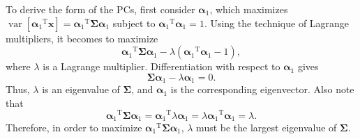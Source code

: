 To derive the form of the PCs, first consider $\boldsymbol{\alpha}_1$, which maximizes $\operatorname{var}\left[{\boldsymbol{\alpha}_1}^{\operatorname{T}}\mathbf{x}\right]={\boldsymbol{\alpha}_1}^{\operatorname{T}}\boldsymbol{\Sigma}\boldsymbol{\alpha}_1$ subject to ${\boldsymbol{\alpha}_1}^{\operatorname{T}}\boldsymbol{\alpha}_1=1$. Using the technique of Lagrange multipliers, it becomes to maximize
\begin{equation}
	{\boldsymbol{\alpha}_1}^{\operatorname{T}}\boldsymbol{\Sigma}\boldsymbol{\alpha}_1-\lambda ({\boldsymbol{\alpha}_1}^{\operatorname{T}}\boldsymbol{\alpha}_1-1),
\end{equation}
where $\lambda$ is a Lagrange multiplier. Differentiation with respect to $\boldsymbol{\alpha}_1$ gives
\begin{equation}
	\boldsymbol{\Sigma}\boldsymbol{\alpha}_1-\lambda \boldsymbol{\alpha}_1=0.
\end{equation}
Thus, $\lambda$ is an eigenvalue of $\boldsymbol{\Sigma}$, and $\boldsymbol{\alpha}_1$ is the corresponding eigenvector. Also note that
\begin{equation}
	{\boldsymbol{\alpha}_1}^{\operatorname{T}}\boldsymbol{\Sigma} \boldsymbol{\alpha}_1={\boldsymbol{\alpha}_1}^{\operatorname{T}} \lambda \boldsymbol{\alpha}_1=\lambda {\boldsymbol{\alpha}_1}^{\operatorname{T}} \boldsymbol{\alpha}_1=\lambda.
\end{equation}
Therefore, in order to maximize ${\boldsymbol{\alpha}_1}^{\operatorname{T}}\boldsymbol{\Sigma} \boldsymbol{\alpha}_1$, $\lambda$ must be the largest eigenvalue of $\boldsymbol{\Sigma}$.

